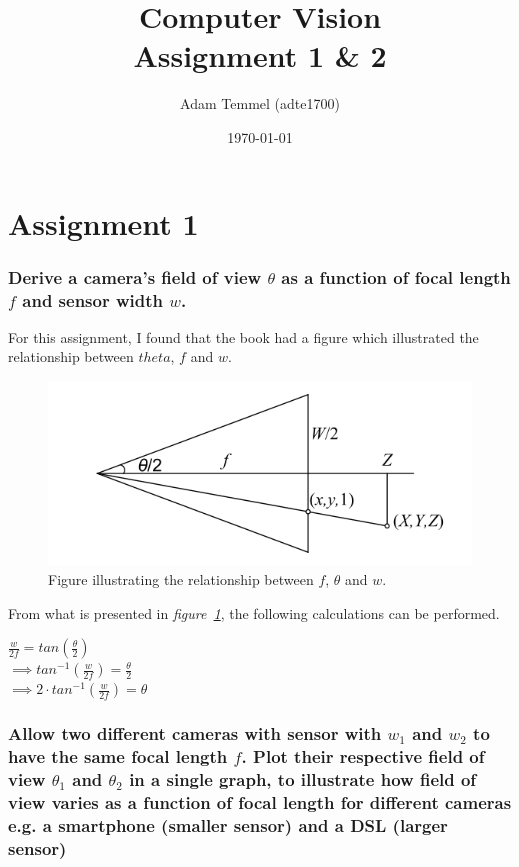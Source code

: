 \documentclass[a4paper, titlepage,12pt]{article}
\title{Computer Vision\\Assignment 1 \& 2}
\author{Adam Temmel (adte1700)}
\date{\today}
\begin{document}
\maketitle

\section*{Assignment 1}
	\subsubsection*{Derive a camera's field of view $\theta$ as a function of focal length $f$ and sensor width $w$.}

	For this assignment, I found that the book had a figure which illustrated the relationship between $theta$, $f$ and $w$.

	\begin{figure}[h!]
		\begin{center}
			\includegraphics[scale=0.5]{./projection.png}
			\caption{Figure illustrating the relationship between $f$, $\theta$ and $w$.}
			\label{img-fov}
		\end{center}
	\end{figure}

	From what is presented in \textit{figure~\ref{img-fov}}, the following calculations can be performed.

	\begin{center}
		$\frac{w}{2f} = tan(\frac{\theta}{2})$\\
		$\implies tan^{-1}(\frac{w}{2f}) = \frac{\theta}{2}$\\
		$\implies  2 \cdot tan^{-1}(\frac{w}{2f}) = \theta$
	\end{center}

\subsubsection*{Allow two different cameras with sensor with $w_1$ and $w_2$ to have the same focal length $f$. Plot their respective field of view $\theta_1$ and $\theta_2$ in a single graph, to illustrate how field of view varies as a function of focal length for different cameras e.g. a smartphone (smaller sensor) and a DSL (larger sensor)}
\end{document}

